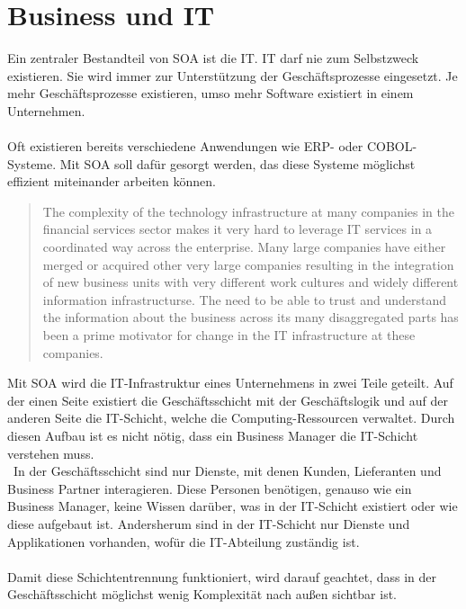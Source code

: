 \section{Business und IT}
\label{sec:BusinessAndIT}
Ein zentraler Bestandteil von SOA ist die IT. IT darf nie zum Selbstzweck existieren. Sie wird immer zur Unterstützung der Geschäftsprozesse eingesetzt. Je mehr Geschäftsprozesse existieren, umso mehr Software existiert in einem Unternehmen.
\\\\
Oft existieren bereits verschiedene Anwendungen wie ERP- oder COBOL-Systeme. Mit SOA soll dafür gesorgt werden, das diese Systeme möglichst effizient miteinander arbeiten können.
\begin{quotation}
    \frqq The complexity of the technology infrastructure at many companies in the financial services sector makes it very hard to leverage IT services in a coordinated way across the enterprise. Many large companies have either merged or acquired other very large companies resulting in the integration of new business units with very different work cultures and widely different information infrastructurse. The need to be able to trust and understand the information about the business across its many disaggregated parts has been a prime motivator for change in the IT infrastructure at these companies.\flqq \cite[S. 17]{SOAForDummies}
\end{quotation}

Mit SOA wird die IT-Infrastruktur eines Unternehmens in zwei Teile geteilt. Auf der einen Seite existiert die Geschäftsschicht mit der Geschäftslogik und auf der anderen Seite die IT-Schicht, welche die Computing-Ressourcen verwaltet. Durch diesen Aufbau ist es nicht nötig, dass ein Business Manager die IT-Schicht verstehen muss.
\\\
In der Geschäftsschicht sind nur Dienste, mit denen Kunden, Lieferanten und Business Partner interagieren. Diese Personen benötigen, genauso wie ein Business Manager, keine Wissen darüber, was in der IT-Schicht existiert oder wie diese aufgebaut ist. Andersherum sind in der IT-Schicht nur Dienste und Applikationen vorhanden, wofür die IT-Abteilung zuständig ist.
\\\\
Damit diese Schichtentrennung funktioniert, wird darauf geachtet, dass in der Geschäftsschicht möglichst wenig Komplexität nach außen sichtbar ist.

